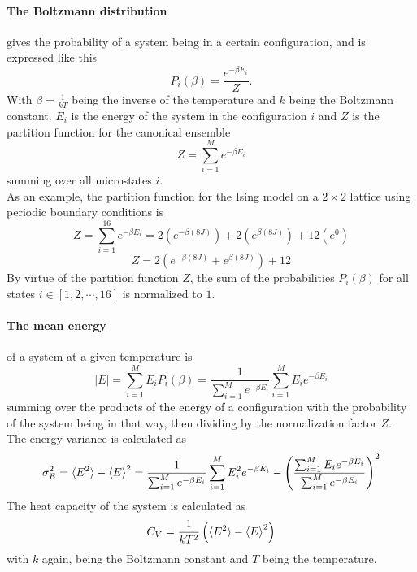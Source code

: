 \documentclass[10pt,a4paper]{article}
\begin{document}
\paragraph{The Boltzmann distribution}gives the probability of a system being in a certain configuration, and is expressed like this
\begin{equation}
P_i(\beta) = \frac{e^{-\beta E_i}}{Z}.
\end{equation}
With $\beta = \frac{1}{kT}$ being the inverse of the temperature and $k$ being the Boltzmann constant. $E_i$ is the energy of the system in the configuration $i$ and $Z$ is the partition function for the canonical ensemble
\begin{equation}
Z = \sum_{i=1}^M e^{-\beta E_i}
\end{equation}
summing over all microstates $i$. \cite{Lecture_Notes_Fall_2015}\\As an example, the partition function for the Ising model on a $2\times2$ lattice using periodic boundary conditions is
\begin{equation}
Z = \sum_{i=1}^{16} e^{-\beta E_i} = 2\left( e^{-\beta (8J)} \right) +2\left( e^{\beta (8J)} \right) +12\left( e^{0} \right)
\end{equation}
\begin{equation}
Z =  2\left( e^{-\beta (8J)} +e^{\beta (8J)} \right)+12
\end{equation}
By virtue of the partition function $Z$, the sum of the probabilities $P_i(\beta)$ for all states $i \in [1,2,\cdots,16]$ is normalized to $1$. 
\paragraph{The mean energy} of a system at a given temperature is 
\begin{equation}\label{mean energy equation}
|E| = \sum_{i=1}^{M} E_iP_i(\beta) = \frac{1}{\sum_{i=1}^M e^{-\beta E_i}} \sum_{i=1}^M E_ie^{-\beta E_i}
\end{equation}
summing over the products of the energy of a configuration with the probability of the system being in that way, then dividing by the normalization factor $Z$.\\The energy variance is calculated as
\begin{equation}\label{C_V definition equation}
\sigma_E^2 = \braket{E^2}-\braket{E}^2 = \frac{1}{\sum_{i=1}^M e^{-\beta E_i}} \sum_{i=1}^M E_i^2e^{-\beta E_i} - \left( \frac{\sum_{i=1}^M E_ie^{-\beta E_i}}{\sum_{i=1}^M e^{-\beta E_i}} \right)^2
\end{equation}
The heat capacity of the system is calculated as 
\begin{equation}
C_V = \frac{1}{kT^2} \left(  \braket{E^2}-\braket{E}^2  \right)
\end{equation}
with $k$ again, being the Boltzmann constant and $T$ being the temperature.
\end{document}
